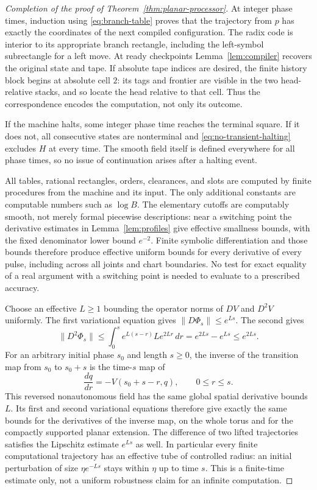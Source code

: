 \documentclass[11pt]{article}
\theoremstyle{remark}\newtheorem{remark}[theorem]{Remark}
\begin{document}
\begin{proof}[Completion of the proof of Theorem~\ref{thm:planar-processor}]
At integer phase times, induction using \eqref{eq:branch-table} proves
that the trajectory from $p$ has exactly the coordinates of the next
compiled configuration.  The radix code is interior to its appropriate
branch rectangle, including the left-symbol subrectangle for a left
move.  At ready checkpoints Lemma~\ref{lem:compiler} recovers the
original state and tape.  If absolute tape indices are desired, the
finite history block begins at absolute cell $2$: its tags and frontier
are visible in the two head-relative stacks, and so locate the head
relative to that cell.  Thus the correspondence encodes the computation,
not only its outcome.

If the machine halts, some integer phase time reaches the terminal
square.  If it does not, all consecutive states are nonterminal and
\eqref{eq:no-transient-halting} excludes $H$ at every time.  The smooth
field itself is defined everywhere for all phase times, so no issue
of continuation arises after a halting event.

All tables, rational rectangles, orders, clearances, and slots are
computed by finite procedures from the machine and its input.  The
only additional constants are computable numbers such as $\log B$.
The elementary cutoffs are computably smooth, not merely formal
piecewise descriptions: near a switching point the derivative estimates
in Lemma~\ref{lem:profiles} give effective smallness bounds, with the
fixed denominator lower bound $e^{-2}$.  Finite symbolic
differentiation and those bounds therefore produce effective uniform
bounds for every derivative of every pulse, including across all
joints and chart boundaries.  No test for exact equality of a real
argument with a switching point is needed to evaluate to a prescribed
accuracy.

Choose an effective $L\ge1$ bounding the operator norms of $D V$ and
$D^2 V$ uniformly.  The first variational equation gives
$\|D\Phi_s\|\le e^{Ls}$.  The second gives
\[
 \|D^2\Phi_s\|
 \le \int_0^s e^{L(s-r)}L e^{2Lr}\,dr
 =e^{2Ls}-e^{Ls}\le e^{2Ls}.
\]
For an arbitrary initial phase $s_0$ and length $s\ge0$, the inverse
of the transition map from $s_0$ to $s_0+s$ is the time-$s$ map of
\[
 \frac{dq}{dr}=-V(s_0+s-r,q),\qquad 0\le r\le s.
\]
This reversed nonautonomous field has the same global spatial derivative
bounds $L$. Its first and second variational equations therefore give
exactly the same bounds for the derivatives of the inverse map, on the
whole torus and for the compactly supported planar extension.  The difference of two lifted trajectories
satisfies the Lipschitz estimate $e^{Ls}$ as well.  In particular
every finite computational trajectory has an effective tube of
controlled radius: an initial perturbation of size
$\eta e^{-Ls}$ stays within $\eta$ up to time $s$.  This is a
finite-time estimate only, not a uniform robustness claim for an
infinite computation.
\end{proof}
\end{document}
